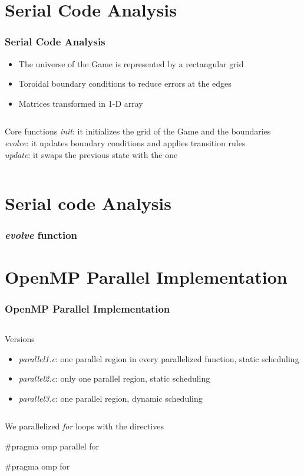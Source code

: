 \documentclass{beamer}
\begin{document}
\section{Serial Code Analysis}
\begin{frame}
	\frametitle{Serial Code Analysis}
	\begin{itemize}
		\item The universe of the Game is represented by a rectangular grid
		\item Toroidal boundary conditions to reduce errors at the edges
		\item Matrices transformed in 1-D array
	\end{itemize}

	\begin{columns}
		\begin{block}{Core functions}
			\textit{init}: it initializes the grid of the Game and the boundaries\\[0.15 cm]
			\textit{evolve}: it updates boundary conditions and applies transition rules\\[0.15 cm]
			\textit{update}: it swaps the previous state with the one
		\end{block}
	\end{columns}
\end{frame}

\section{Serial code Analysis}
\begin{frame}
	\frametitle{\emph{evolve} function}
\end{frame}

\section{OpenMP Parallel Implementation}
\begin{frame}[fragile]
	\frametitle{OpenMP Parallel Implementation}

	\begin{columns}
		\column{0.9\textwidth}
		\begin{block}{Versions}
			\begin{itemize}
				\item \emph{parallel1.c}: one parallel region in every parallelized function, static scheduling
				\item \emph{parallel2.c}: only one parallel region, static scheduling
				\item \emph{parallel3.c}: one parallel region, dynamic scheduling
			\end{itemize}
		\end{block}
	\end{columns}

	\vfill
	We parallelized \emph{for} loops with the directives \begin{semiverbatim}#pragma omp parallel for\end{semiverbatim} \begin{semiverbatim}#pragma omp for\end{semiverbatim}
\end{frame}
\end{document}
